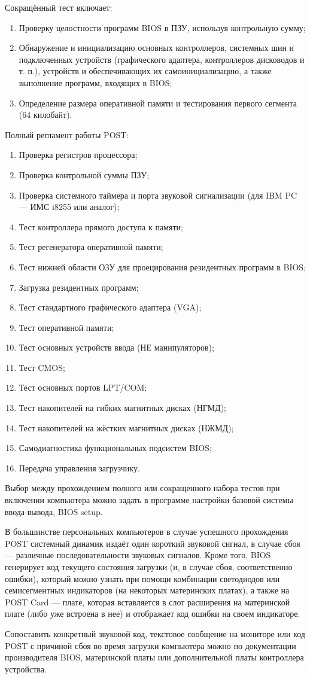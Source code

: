 Сокращённый тест включает:
\begin{enumerate}
 \item Проверку целостности программ BIOS в ПЗУ, используя контрольную сумму;
 \item Обнаружение и инициализацию основных контроллеров, системных шин и подключенных устройств (графического адаптера, контроллеров дисководов и т. п.), устройств и обеспечивающих их самоинициализацию, а также выполнение программ, входящих в BIOS;
 \item Определение размера оперативной памяти и тестирования первого сегмента (64 килобайт).
\end{enumerate}

Полный регламент работы POST:
\begin{enumerate}
 \item Проверка регистров процессора;
 \item Проверка контрольной суммы ПЗУ;
 \item Проверка системного таймера и порта звуковой сигнализации (для IBM PC — ИМС i8255 или аналог);
 \item Тест контроллера прямого доступа к памяти;
 \item Тест регенератора оперативной памяти;
 \item Тест нижней области ОЗУ для проецирования резидентных программ в BIOS;
 \item Загрузка резидентных программ;
 \item Тест стандартного графического адаптера (VGA);
 \item Тест оперативной памяти;
 \item Тест основных устройств ввода (НЕ манипуляторов);
 \item Тест CMOS;
 \item Тест основных портов LPT/COM;
 \item Тест накопителей на гибких магнитных дисках (НГМД);
 \item Тест накопителей на жёстких магнитных дисках (НЖМД);
 \item Самодиагностика функциональных подсистем BIOS;
 \item Передача управления загрузчику.
\end{enumerate}

Выбор между прохождением полного или сокращенного набора тестов при включении компьютера можно задать в программе настройки базовой системы ввода-вывода, BIOS setup.

В большинстве персональных компьютеров в случае успешного прохождения POST системный динамик издаёт один короткий звуковой сигнал, в случае сбоя — различные последовательности звуковых сигналов. Кроме того, BIOS генерирует код текущего состояния загрузки (и, в случае сбоя, соответственно ошибки), который можно узнать при помощи комбинации светодиодов или семисегментных индикаторов (на некоторых материнских платах), а также на POST Card — плате, которая вставляется в слот расширения на материнской плате (либо уже встроена в нее) и отображает код ошибки на своем индикаторе.
 
Сопоставить конкретный звуковой код, текстовое сообщение на мониторе или код POST с причиной сбоя во время загрузки компьютера можно по документации производителя BIOS, материнской платы или дополнительной платы контроллера устройства.
